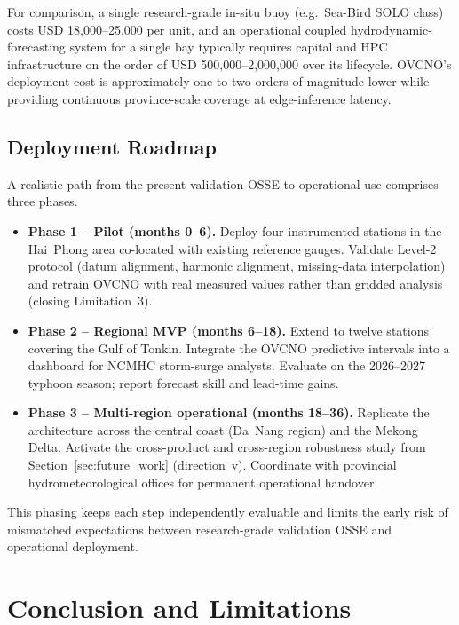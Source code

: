 \documentclass[11pt,a4paper]{article}
\begin{document}
For comparison, a single research-grade in-situ buoy (e.g.\ Sea-Bird SOLO class) costs USD 18{,}000--25{,}000 per unit, and an operational coupled hydrodynamic-forecasting system for a single bay typically requires capital and HPC infrastructure on the order of USD 500{,}000--2{,}000{,}000 over its lifecycle. OVCNO's deployment cost is approximately one-to-two orders of magnitude lower while providing continuous province-scale coverage at edge-inference latency.

\subsection{Deployment Roadmap}

A realistic path from the present validation OSSE to operational use comprises three phases.

\begin{itemize}
    \item \textbf{Phase 1 -- Pilot (months 0--6).} Deploy four instrumented stations in the Hai~Phong area co-located with existing reference gauges. Validate Level-2 protocol (datum alignment, harmonic alignment, missing-data interpolation) and retrain OVCNO with real measured values rather than gridded analysis (closing Limitation~3).
    \item \textbf{Phase 2 -- Regional MVP (months 6--18).} Extend to twelve stations covering the Gulf of Tonkin. Integrate the OVCNO predictive intervals into a dashboard for NCMHC storm-surge analysts. Evaluate on the 2026--2027 typhoon season; report forecast skill and lead-time gains.
    \item \textbf{Phase 3 -- Multi-region operational (months 18--36).} Replicate the architecture across the central coast (Da~Nang region) and the Mekong Delta. Activate the cross-product and cross-region robustness study from Section~\ref{sec:future_work} (direction~v). Coordinate with provincial hydrometeorological offices for permanent operational handover.
\end{itemize}

This phasing keeps each step independently evaluable and limits the early risk of mismatched expectations between research-grade validation OSSE and operational deployment.

\section{Conclusion and Limitations}
\label{sec:conclusion}
\end{document}
